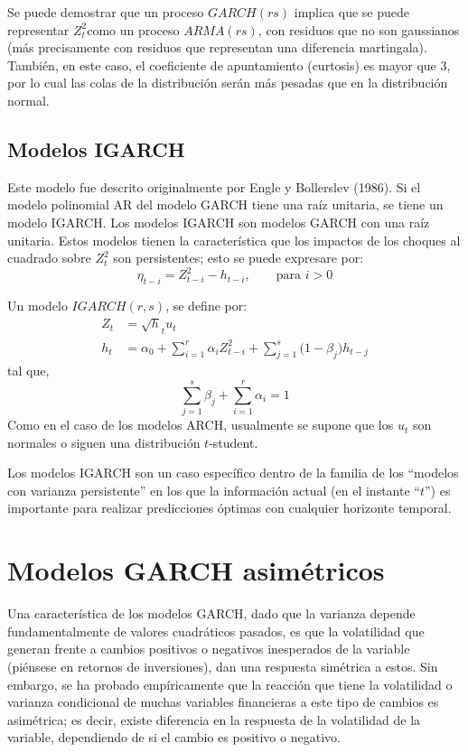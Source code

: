 \begin{observacion}
 Se puede demostrar que un proceso $GARCH(rs)$ 
implica que se puede representar $Z_{t}^{2}$como un proceso $ARMA(rs)$, con 
residuos que no son gaussianos (m\'{a}s precisamente con residuos que 
representan una diferencia martingala). Tambi\'{e}n, en este caso, el 
coeficiente de apuntamiento (curtosis) es mayor que 3, por lo cual las colas 
de la distribuci\'{o}n ser\'{a}n m\'{a}s pesadas que en la distribuci\'{o}n 
normal.
\end{observacion}




\subsection*{Modelos IGARCH}

Este modelo fue descrito originalmente por Engle y Bollerslev (1986). Si el 
modelo polinomial AR del modelo GARCH tiene una ra\'{i}z unitaria, se tiene 
un modelo IGARCH. Los modelos IGARCH son 
modelos GARCH con una ra\'{i}z unitaria. Estos modelos tienen la 
caracter\'{i}stica que los impactos de los choques al cuadrado sobre 
$Z_{t}^{2}$ son persistentes; esto se puede expresare por:
\[
\eta_{t-i}=Z_{t-i}^{2}-h_{t-i},\qquad\text{para }i>0
\]

\begin{definicion}
 Un modelo $IGARCH(r,s)$, se define por:
\begin{align*}
Z_{t}&=\sqrt h_{t} u_{t} \\ 
h_{t}&=\alpha_{0}+\sum_{i=1}^r {\alpha_{i}Z_{t-i}^{2}} 
+\sum_{j=1}^s {{(1-\beta }_{j})h_{t-j}}
\end{align*}
tal que,
\[
\sum_{j=1}^s \beta_{j} +\sum_{i=1}^r \alpha_{i} =1
\]
Como en el caso de los modelos ARCH, usualmente se supone que los $u_{t}$ 
son normales o siguen una distribuci\'{o}n $t$-student.
\end{definicion}

Los modelos IGARCH son un caso espec\'{i}fico dentro de la familia de los 
``modelos con varianza persistente'' en los que la informaci\'{o}n actual (en 
el instante ``$t$'') es importante para realizar predicciones \'{o}ptimas con 
cualquier horizonte temporal.


\section{Modelos GARCH asim\'etricos}

Una caracter\'{i}stica de los modelos GARCH, dado que la varianza depende 
fundamentalmente de valores cuadr\'{a}ticos pasados, es que la volatilidad 
que generan frente a cambios positivos o negativos inesperados de la 
variable (pi\'{e}nsese en retornos de inversiones), dan una respuesta 
sim\'{e}trica a estos. Sin embargo, se ha probado emp\'{i}ricamente que la 
reacci\'{o}n que tiene la volatilidad o varianza condicional de muchas 
variables financieras a este tipo de cambios es asim\'{e}trica; es decir, 
existe diferencia en la respuesta de la volatilidad de la variable, 
dependiendo de si el cambio es positivo o negativo. 

